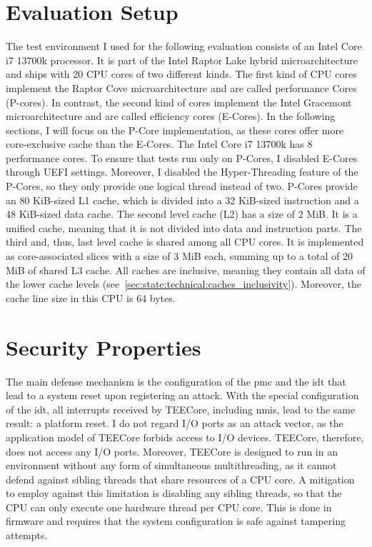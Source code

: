 \section{Evaluation Setup}
\label{sec:evaluation:setup}
The test environment I used for the following evaluation consists of an Intel
Core i7 13700k processor. It is part of the Intel Raptor Lake hybrid
microarchitecture and ships with 20 CPU cores of two different kinds. The first
kind of CPU cores implement the Raptor Cove microarchitecture and are called
performance Cores (P-cores). In contrast, the second kind of cores implement the
Intel Gracemont microarchitecture and are called efficiency cores (E-Cores). In
the following sections, I will focus on the P-Core implementation, as these
cores offer more core-exclusive cache than the E-Cores. The Intel Core i7 13700k
has 8 performance cores. To ensure that tests run only on P-Cores, I disabled
E-Cores through UEFI settings. Moreover, I disabled the Hyper-Threading feature
of the P-Cores, so they only provide one logical thread instead of two. P-Cores
provide an 80 KiB-sized L1 cache, which is divided into a 32 KiB-sized
instruction and a 48 KiB-sized data cache. The second level cache (L2) has a
size of 2 MiB. It is a unified cache, meaning that it is not divided into data
and instruction parts. The third and, thus, last level cache is shared among all
CPU cores. It is implemented as core-associated slices with a size of 3 MiB
each, summing up to a total of 20 MiB of shared L3 cache. All caches are
inclusive, meaning they contain all data of the lower cache levels
(see~\ref{sec:state:technical:caches_inclusivity}). Moreover, the cache line
size in this CPU is 64 bytes.

\section{Security Properties}
\label{eval:sec}
The main defense mechanism is the configuration of the \gls{pmc} and the
\gls{idt} that lead to a system reset upon registering an attack. With the
special configuration of the \gls{idt}, all interrupts received by TEECore,
including \glspl{nmi}, lead to the same result: a platform reset. I do not
regard I/O ports as an attack vector, as the application model of TEECore
forbids access to I/O devices. TEECore, therefore, does not access any I/O
ports. Moreover, TEECore is designed to run in an environment without any form
of simultaneous multithreading, as it cannot defend against sibling threads that
share resources of a CPU core. A mitigation to employ against this limitation is
disabling any sibling threads, so that the CPU can only execute one hardware
thread per CPU core. This is done in firmware and requires that the system
configuration is safe against tampering attempts.\\

